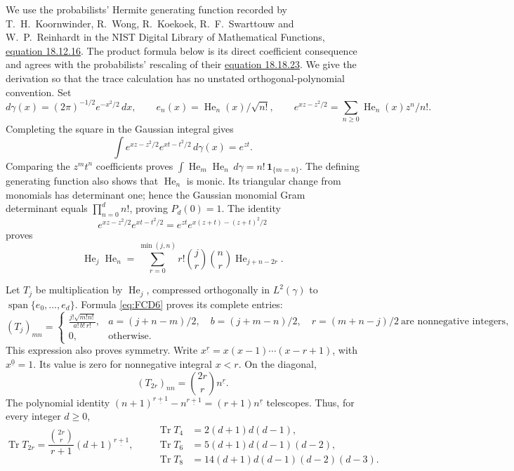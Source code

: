 \documentclass[11pt]{article}
\begin{document}
We use the probabilists' Hermite generating function recorded by
T.~H.~Koornwinder, R.~Wong, R.~Koekoek, R.~F.~Swarttouw and
W.~P.~Reinhardt in the NIST Digital Library of Mathematical Functions,
\href{https://dlmf.nist.gov/18.12.E16}{equation 18.12.16}.
The product formula below is its direct coefficient consequence and agrees
with the probabilists' rescaling of their
\href{https://dlmf.nist.gov/18.18.E23}{equation 18.18.23}.
We give the derivation so that the trace calculation has no unstated
orthogonal-polynomial convention.
Set
\[
 d\gamma(x)=(2\pi)^{-1/2}e^{-x^2/2}\,dx,\qquad
 e_n(x)=\operatorname{He}_n(x)/\sqrt{n!},\qquad
 e^{xz-z^2/2}=\sum_{n\ge0}\operatorname{He}_n(x)z^n/n!.
\]
Completing the square in the Gaussian integral gives
\[
 \int e^{xz-z^2/2}e^{xt-t^2/2}\,d\gamma(x)=e^{zt}.
\]
Comparing the \(z^mt^n\) coefficients proves
\(\int \operatorname{He}_m\operatorname{He}_n\,d\gamma
   =n!\,\mathbf1_{\{m=n\}}\).
The defining generating function also shows that
\(\operatorname{He}_n\) is monic. Its triangular change from monomials has
determinant one; hence the Gaussian monomial Gram determinant equals
\(\prod_{n=0}^d n!\), proving \(P_d(0)=1\).
The identity
\[
 e^{xz-z^2/2}e^{xt-t^2/2}
    =e^{zt}e^{x(z+t)-(z+t)^2/2}
\]
proves
\begin{equation}
 \operatorname{He}_j\operatorname{He}_n
   =\sum_{r=0}^{\min(j,n)}
       r!\binom jr\binom nr\operatorname{He}_{j+n-2r}.
 \tag{FCD6}\label{eq:FCD6}
\end{equation}

Let \(T_j\) be multiplication by \(\operatorname{He}_j\), compressed
orthogonally in \(L^2(\gamma)\) to
\(\operatorname{span}\{e_0,\ldots,e_d\}\). Formula \eqref{eq:FCD6}
proves its complete entries:
\begin{equation}
 (T_j)_{mn}=
 \begin{cases}
 \displaystyle
 \frac{j!\sqrt{m!n!}}{a!\,b!\,r!},
 &
 a=(j+n-m)/2,\quad b=(j+m-n)/2,\quad r=(m+n-j)/2
       \ \text{are nonnegative integers},\\[4pt]
 0,&\text{otherwise}.
 \end{cases}
 \tag{FCD7}\label{eq:FCD7}
\end{equation}
This expression also proves symmetry. Write
\(x^{\underline r}=x(x-1)\cdots(x-r+1)\), with
\(x^{\underline0}=1\). Its value is zero for nonnegative integral
\(x<r\). On the diagonal,
\[
 (T_{2r})_{nn}=\binom{2r}{r}n^{\underline r}.
\]
The polynomial identity
\((n+1)^{\underline{r+1}}-n^{\underline{r+1}}
 =(r+1)n^{\underline r}\)
telescopes. Thus, for every integer \(d\ge0\),
\begin{equation}
 \operatorname{Tr}T_{2r}
    =\frac{\binom{2r}{r}}{r+1}(d+1)^{\underline{r+1}},
 \qquad
 \begin{split}
 \operatorname{Tr}T_4&=2(d+1)d(d-1),\\
 \operatorname{Tr}T_6&=5(d+1)d(d-1)(d-2),\\
 \operatorname{Tr}T_8&=14(d+1)d(d-1)(d-2)(d-3).
 \end{split}
 \tag{FCD8}\label{eq:FCD8}
\end{equation}
\end{document}
